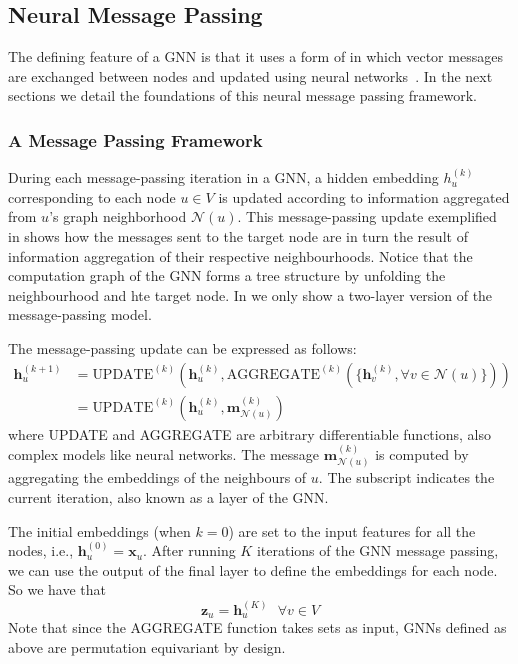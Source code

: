 \subsection{Neural Message Passing}
The defining feature of a GNN is that it uses a form of  in which vector messages are exchanged between nodes and updated using neural networks~\cite{Gilmer2017neuralMessagePassing}. In the next sections we detail the foundations of this neural message passing framework.

\subsubsection{A Message Passing Framework}
During each message-passing iteration in a GNN, a hidden embedding $h_u^{(k)}$ corresponding to each node $u\in V$ is updated according to information aggregated
from $u$’s graph neighborhood $\mathcal{N} (u)$. This message-passing update exemplified in  shows how the messages sent to the target node are in turn the result of information aggregation of their respective neighbourhoods. Notice that the computation graph of the GNN forms a tree structure by unfolding the neighbourhood and hte target node. In  we only show a two-layer version of the message-passing model.



The message-passing update can be expressed as follows:
\begin{align}\label{eq:GNNupdate}
    \mathbf{h}_u^{(k+1)} &= \text{UPDATE}^{(k)}\left(\mathbf{h}_u^{(k)}, \text{AGGREGATE}^{(k)}(\{\mathbf{h}_v^{(k)}, \forall v \in \mathcal{N}(u)\})\right) \\
    &= \text{UPDATE}^{(k)}\left(\mathbf{h}_u^{(k)}, \mathbf{m}_{\mathcal{N}(u)}^{(k)}\right)
\end{align}
where UPDATE and AGGREGATE are arbitrary differentiable functions, also complex models like neural networks. The message $\mathbf{m}_{\mathcal{N}(u)}^{(k)}$ is computed by aggregating the embeddings of the neighbours of $u$. The subscript indicates the current iteration, also known as a layer of the GNN.

The initial embeddings (when $k=0$) are set to the input features for all the nodes, i.e., $\mathbf{h}_u^{(0)} = \mathbf{x}_u$. After running $K$ iterations of the GNN message passing, we can use the output of the final layer to define the embeddings for each node. So we have that
\begin{equation*}
    \mathbf{z}_u=\mathbf{h}_u^{(K)} \text{   }\forall v \in V
\end{equation*}
Note that since the AGGREGATE function takes sets as input, GNNs defined as above are permutation equivariant by design.

